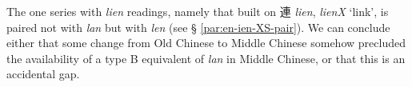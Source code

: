 
















The one series with \textit{lien} readings, namely that built on 連  \textit{lien}, \textit{lienX} `link', is paired not with \textit{lan} but with \textit{len} (see § \ref{par:en-ien-XS-pair}). 
We can conclude either that some change from Old Chinese to Middle Chinese somehow precluded the availability of a type B equivalent of \textit{lan} in Middle Chinese, or that this is an accidental gap. 

